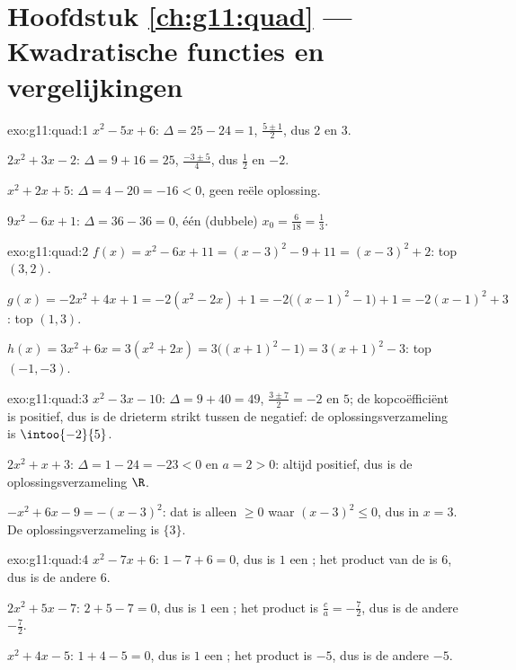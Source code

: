 \section*{Hoofdstuk \ref{ch:g11:quad} --- Kwadratische functies en vergelijkingen}

\begin{solution}{exo:g11:quad:1}
$x^2-5x+6$: $\Delta = 25 - 24 = 1$,  $\frac{5 \pm 1}{2}$, dus $2$ en
$3$.

$2x^2+3x-2$: $\Delta = 9 + 16 = 25$,  $\frac{-3 \pm 5}{4}$, dus
$\frac12$ en $-2$.

$x^2+2x+5$: $\Delta = 4 - 20 = -16 < 0$, geen reële oplossing.

$9x^2-6x+1$: $\Delta = 36 - 36 = 0$, één (dubbele) 
$x_0 = \frac{6}{18} = \frac13$.
\end{solution}

\begin{solution}{exo:g11:quad:2}
$f(x) = x^2 - 6x + 11 = (x-3)^2 - 9 + 11 = (x-3)^2 + 2$: top $(3, 2)$.

$g(x) = -2x^2+4x+1 = -2(x^2 - 2x) + 1 = -2\bigl((x-1)^2 - 1\bigr) + 1
= -2(x-1)^2 + 3$: top $(1, 3)$.

$h(x) = 3x^2 + 6x = 3(x^2 + 2x) = 3\bigl((x+1)^2 - 1\bigr)
= 3(x+1)^2 - 3$: top $(-1, -3)$.
\end{solution}

\begin{solution}{exo:g11:quad:3}
$x^2 - 3x - 10$: $\Delta = 9 + 40 = 49$, 
$\frac{3 \pm 7}{2} = -2$ en $5$; de kopcoëfficiënt is positief, dus is de
drieterm strikt tussen de  negatief: de oplossingsverzameling is
$\intoo{-2}{5}$.

$2x^2 + x + 3$: $\Delta = 1 - 24 = -23 < 0$ en $a = 2 > 0$: altijd positief,
dus is de oplossingsverzameling $\R$.

$-x^2 + 6x - 9 = -(x-3)^2$: dat is alleen $\geq 0$ waar
$(x-3)^2 \leq 0$, dus in $x = 3$. De oplossingsverzameling is $\{3\}$.
\end{solution}

\begin{solution}{exo:g11:quad:4}
$x^2 - 7x + 6$: $1 - 7 + 6 = 0$, dus is $1$ een ; het product van de
 is $6$, dus is de andere  $6$.

$2x^2 + 5x - 7$: $2 + 5 - 7 = 0$, dus is $1$ een ; het product is
$\frac{c}{a} = -\frac72$, dus is de andere  $-\frac72$.

$x^2 + 4x - 5$: $1 + 4 - 5 = 0$, dus is $1$ een ; het product is $-5$,
dus is de andere  $-5$.
\end{solution}

